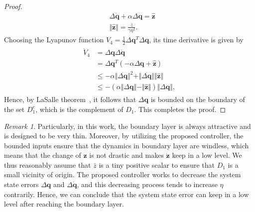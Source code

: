\documentclass[3p]{elsarticle}
\theoremstyle{plain}
\theoremstyle{remark}
\newtheorem{myrem}{Remark}
\begin{document}
{\begin{proof}
\begin{align}
&\Delta \dot {\bm q}+\alpha\Delta\bm q=\hat{\bm z}\\
&\Vert\hat{\bm z}\Vert=\frac{\bar z}{\gamma\eta^2}.
\end{align}
Choosing the Lyapunov function $V_4=\frac{1}{2}\Delta\bm q^T\Delta\bm q$, its time derivative is given by
\begin{align}\begin{split}
\dot V_4 &= \Delta\bm q\Delta\dot{\bm q}\\
&=\Delta\bm q^T(-\alpha\Delta\bm q+\hat{\bm z})\\
&\le-\alpha\Vert\Delta\bm q\Vert^2+\Vert\Delta\bm q\Vert\Vert\hat{\bm z}\Vert\\
&\le-(\alpha\Vert\Delta\bm q\Vert-\Vert\hat{\bm z}\Vert)\Vert\Delta\bm q\Vert,
\end{split}\end{align}
Hence, by LaSalle theorem~\cite{lasalle1960some}, it follows that $\Delta\bm q$ is bounded on the boundary of the set $D_1^c$, which is the complement of $D_1$. This completes the proof.
\end{proof}
\begin{myrem}
Particularly, in this work, the boundary layer is always attractive and is designed to be very thin. Moreover, by utilizing the proposed controller, the bounded inputs ensure that the dynamics in boundary layer are windless, which means that the change of $\bm z$ is not drastic and makes $\dot{\bm z}$ keep in a low level. We thus reasonably assume that $\bar z$ is a tiny positive scalar to ensure that $D_1$ is a small vicinity of origin. The proposed controller works to decrease the system state errors $\Delta\bm q$ and $\Delta\dot{\bm q}$, and this decreasing process tends to increase $\eta$ contrarily. Hence, we can conclude that the system state error can keep in a low level after reaching the boundary layer.
\end{myrem}
}
\end{document}
